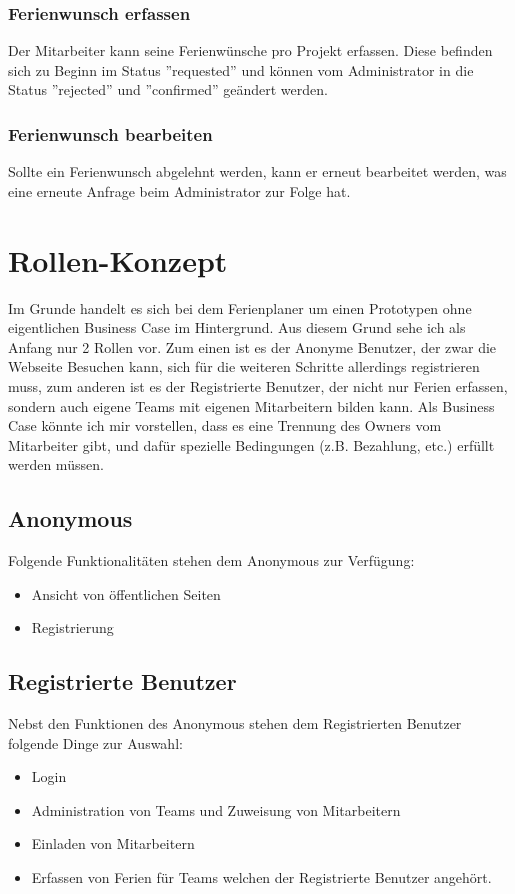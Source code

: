 \subsubsection{Ferienwunsch erfassen}
Der Mitarbeiter kann seine Ferienw\"unsche pro Projekt erfassen. Diese befinden sich zu Beginn im Status ''requested'' und k\"onnen vom Administrator in die Status ''rejected'' und ''confirmed'' ge\"andert werden.

\subsubsection{Ferienwunsch bearbeiten}
Sollte ein Ferienwunsch abgelehnt werden, kann er erneut bearbeitet werden, was eine erneute Anfrage beim Administrator zur Folge hat.

\section{Rollen-Konzept}\label{konzept:rollen}
Im Grunde handelt es sich bei dem Ferienplaner um einen Prototypen ohne eigentlichen Business Case im Hintergrund. Aus diesem Grund sehe ich als Anfang nur 2 Rollen vor. Zum einen ist es der Anonyme Benutzer, der zwar die Webseite Besuchen kann, sich f\"ur die weiteren Schritte allerdings registrieren muss, zum anderen ist es der Registrierte Benutzer, der nicht nur Ferien erfassen, sondern auch eigene Teams mit eigenen Mitarbeitern bilden kann. Als Business Case k\"onnte ich mir vorstellen, dass es eine Trennung des Owners vom Mitarbeiter gibt, und daf\"ur spezielle Bedingungen (z.B. Bezahlung, etc.) erf\"ullt werden m\"ussen.
\subsection{Anonymous}
Folgende Funktionalit\"aten stehen dem Anonymous zur Verf\"ugung:
\begin{itemize}
\item Ansicht von \"offentlichen Seiten
\item Registrierung
\end{itemize}

\subsection{Registrierte Benutzer}
Nebst den Funktionen des Anonymous stehen dem Registrierten Benutzer folgende Dinge zur Auswahl:
\begin{itemize}
\item Login
\item Administration von Teams und Zuweisung von Mitarbeitern
\item Einladen von Mitarbeitern
\item Erfassen von Ferien f\"ur Teams welchen der Registrierte Benutzer angeh\"ort.
\end{itemize}

